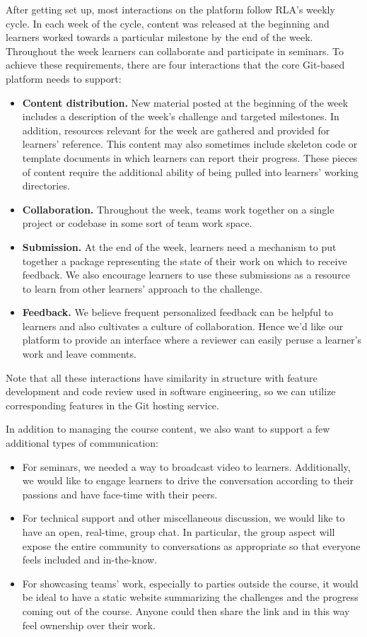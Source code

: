 \documentclass[12pt,twoside]{mitthesis}
\begin{document}
After getting set up, most interactions on the platform follow RLA's weekly cycle. In each week of the cycle, content was released at the beginning and learners worked towards a particular milestone by the end of the week. Throughout the week learners can collaborate and participate in seminars. To achieve these requirements, there are four interactions that the core Git-based platform needs to support:
\begin{itemize}
\item \textbf{Content distribution.} New material posted at the beginning of the week includes a description of the week's challenge and targeted milestones. In addition, resources relevant for the week are gathered and provided for learners' reference. This content may also sometimes include skeleton code or template documents in which learners can report their progress. These pieces of content require the additional ability of being pulled into learners' working directories.
\item \textbf{Collaboration.} Throughout the week, teams work together on a single project or codebase in some sort of team work space. 
\item \textbf{Submission.} At the end of the week, learners need a mechanism to put together a package representing the state of their work on which to receive feedback. We also encourage learners to use these submissions as a resource to learn from other learners' approach to the challenge.
\item \textbf{Feedback.} We believe frequent personalized feedback can be helpful to learners and also cultivates a culture of collaboration. Hence we'd like our platform to provide an interface where a reviewer can easily peruse a learner's work and leave comments. 
\end{itemize}
Note that all these interactions have similarity in structure with feature development and code review used in software engineering, so we can utilize corresponding features in the Git hosting service.

In addition to managing the course content, we also want to support a few additional types of communication:
\begin{itemize}
\item For seminars, we needed a way to broadcast video to learners. Additionally, we would like to engage learners to drive the conversation according to their passions and have face-time with their peers.
\item For technical support and other miscellaneous discussion, we would like to have an open, real-time, group chat. In particular, the group aspect will expose the entire community to conversations as appropriate so that everyone feels included and in-the-know.
\item For showcasing teams' work, especially to parties outside the course, it would be ideal to have a static website summarizing the challenges and the progress coming out of the course. Anyone could then share the link and in this way feel ownership over their work.
\end{itemize}
\end{document}
